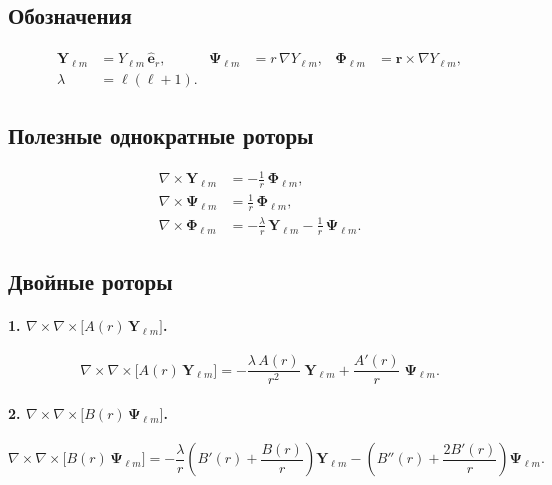 \documentclass{article}
\begin{document}
\subsection*{Обозначения}

\begin{align}
\bm{Y}_{\ell m}    &= Y_{\ell m}\,\hat{\bm e}_r, &
\bm{\Psi}_{\ell m} &= r\,\nabla Y_{\ell m}, &
\bm{\Phi}_{\ell m} &= \bm r \times \nabla Y_{\ell m}, \\
\lambda            &= \ell(\ell+1).
\end{align}

\subsection*{Полезные однократные роторы}

\begin{align}
\nabla\times\bm{Y}_{\ell m}    &= -\frac{1}{r}\,\bm{\Phi}_{\ell m}, \\
\nabla\times\bm{\Psi}_{\ell m} &=  \frac{1}{r}\,\bm{\Phi}_{\ell m}, \\
\nabla\times\bm{\Phi}_{\ell m} &= -\frac{\lambda}{r}\,\bm{Y}_{\ell m}
                                  -\frac{1}{r}\,\bm{\Psi}_{\ell m}.
\end{align}

\subsection*{Двойные роторы}

\paragraph{1. \(\displaystyle\nabla\times\nabla\times\!\bigl[A(r)\,\bm{Y}_{\ell m}\bigr]\).}

\begin{equation}
\nabla\times\nabla\times\!\bigl[A(r)\,\bm{Y}_{\ell m}\bigr]
  = -\frac{\lambda\,A(r)}{r^{2}}\;\bm{Y}_{\ell m}
    +\frac{A'(r)}{r}\;\bm{\Psi}_{\ell m}.
\end{equation}

\paragraph{2. \(\displaystyle\nabla\times\nabla\times\!\bigl[B(r)\,\bm{\Psi}_{\ell m}\bigr]\).}

\begin{equation}
\nabla\times\nabla\times\!\bigl[B(r)\,\bm{\Psi}_{\ell m}\bigr]
  = -\frac{\lambda}{r}\!\left(B'(r)+\frac{B(r)}{r}\right)\bm{Y}_{\ell m}
    -\left(B''(r)+\frac{2B'(r)}{r}\right)\bm{\Psi}_{\ell m}.
\end{equation}
\end{document}
